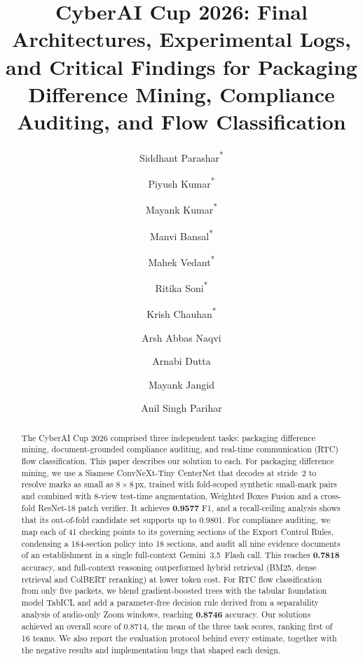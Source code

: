 \documentclass[runningheads]{llncs}
\begin{document}
\title{CyberAI Cup 2026: Final Architectures, Experimental Logs, and Critical Findings for Packaging Difference Mining, Compliance Auditing, and Flow Classification}

\author{
Siddhant Parashar\textsuperscript{*}
\and Piyush Kumar\textsuperscript{*}
\and Mayank Kumar\textsuperscript{*}
\and Manvi Bansal\textsuperscript{*}
\and Mahek Vedant\textsuperscript{*}
\and Ritika Soni\textsuperscript{*}
\and Krish Chauhan\textsuperscript{*}
\and Arsh Abbas Naqvi
\and Arnabi Dutta
\and Mayank Jangid
\and Anil Singh Parihar
}



\maketitle
\begingroup
\renewcommand{\thefootnote}{*}
\endgroup

%
\begin{abstract}
The CyberAI Cup 2026 comprised three independent tasks: packaging difference
mining, document-grounded compliance auditing, and real-time communication (RTC)
flow classification. This paper describes our solution to each.
For packaging difference mining, we use a Siamese ConvNeXt-Tiny CenterNet that
decodes at stride~2 to resolve marks as small as $8\times8$\,px, trained with
fold-scoped synthetic small-mark pairs and combined with 8-view test-time
augmentation, Weighted Boxes Fusion and a cross-fold ResNet-18 patch verifier.
It achieves \textbf{0.9577} F1, and a recall-ceiling analysis shows that its
out-of-fold candidate set supports up to 0.9801.
For compliance auditing, we map each of 41 checking points to its governing
sections of the Export Control Rules, condensing a 184-section policy into 18
sections, and audit all nine evidence documents of an establishment in a single
full-context Gemini~3.5~Flash call. This reaches \textbf{0.7818} accuracy, and
full-context reasoning outperformed hybrid retrieval (BM25, dense retrieval and
ColBERT reranking) at lower token cost.
For RTC flow classification from only five packets, we blend gradient-boosted
trees with the tabular foundation model TabICL and add a parameter-free decision
rule derived from a separability analysis of audio-only Zoom windows, reaching
\textbf{0.8746} accuracy.
Our solutions achieved an overall score of 0.8714, the mean of the three task
scores, ranking first of 16 teams. We also report the evaluation protocol behind
every estimate, together with the negative results and implementation bugs that
shaped each design.
\end{abstract}
\end{document}
